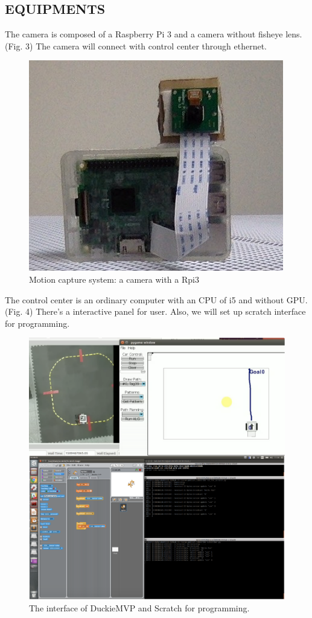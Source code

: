 \documentclass[letterpaper, 10 pt, conference]{ieeeconf}  %
\begin{document}
\subsection{EQUIPMENTS} 

The camera is composed of a Raspberry Pi 3 and a camera without fisheye lens. (Fig. 3) The camera will connect with control center through ethernet. 
\begin{figure}[h] %
\includegraphics[width=0.8\columnwidth]{mocap}
\centering
\caption{Motion capture system: a camera with a Rpi3}
 \label{figure:mocap}
\end{figure}

The control center is an ordinary computer with an CPU of i5 and without GPU. (Fig. 4) There's a interactive panel for user. Also, we will set up scratch interface for programming.
\begin{figure}[h] %
\includegraphics[width=0.8\columnwidth]{interface}
\centering
\caption{The interface of DuckieMVP and Scratch for programming.}
 \label{figure:interface}
\end{figure}
\end{document}

